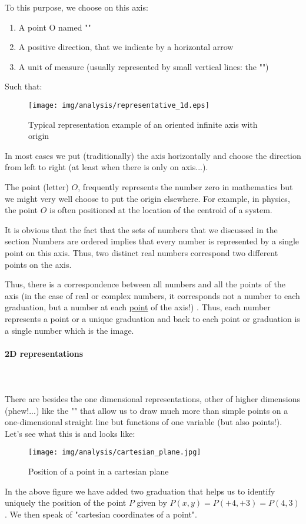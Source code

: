 	To this purpose, we choose on this axis:
	\begin{enumerate}
		\item A point O named ""
		\item A positive direction, that we indicate by a horizontal arrow
		\item A unit of measure (usually represented by small vertical lines: the "")
	\end{enumerate}
Such that:
\begin{figure}[H]
\centering
\texttt{[image: img/analysis/representative\_1d.eps]}
\caption{Typical representation example of an oriented infinite axis with origin}
\end{figure}
In most cases we put (traditionally) the axis horizontally and choose the direction from left to right (at least when there is only on axis...).
	\begin{tcolorbox}[title=Remark,colframe=black,arc=10pt]
The point (letter) $O$, frequently represents the number zero in mathematics but we might very well choose to put the origin elsewhere. For example, in physics, the point $O$ is often positioned at the location of the centroid of a system. 
	\end{tcolorbox}
It is obvious that the fact that the sets of numbers that we discussed in the section Numbers are ordered implies that every number is represented by a single point on this axis. Thus, two distinct real numbers correspond two different points on the axis.

Thus, there is a correspondence between all numbers and all the points of the axis (in the case of real or complex numbers, it corresponds not a number to each graduation, but a number at each \underline{point} of the axis!) . Thus, each number represents a point or a unique graduation and back to each point or graduation is a single number which is the image.

\pagebreak
\paragraph{2D representations}\mbox{}\\\\
There are besides the one dimensional representations, other of higher dimensions (phew!...) like the "" that allow us to draw much more than simple points on a one-dimensional straight line but functions of one variable (but also points!). Let's see what this is and looks like:
\begin{figure}[H]
	\centering
	\texttt{[image: img/analysis/cartesian\_plane.jpg]}
	\caption{Position of a point in a cartesian plane}
\end{figure}
In the above figure we have added two graduation that helps us to identify uniquely the position of the point $P$ given by $P(x,y)=P(+4,+3)=P(4,3)$. We then speak of "cartesian coordinates of a point".

